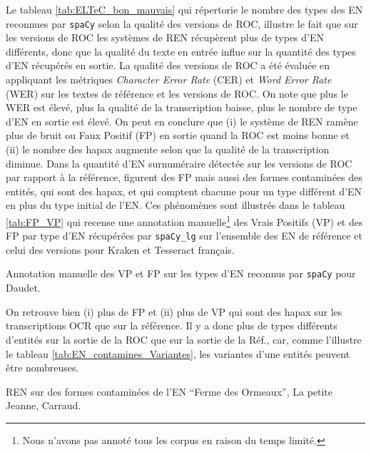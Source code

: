 Le tableau \ref{tab:ELTeC_bon_mauvais} qui répertorie le nombre des types des EN reconnues par \texttt{spaCy} selon la qualité des versions de ROC, illustre le fait que sur les versions de ROC les systèmes de REN récupèrent plus de types d'EN différents, donc que la qualité du texte en entrée influe sur la quantité des types d'EN récupérés en sortie. La qualité des versions de ROC a été évaluée en appliquant les métriques \textit{Character Error Rate} (CER) et \textit{Word Error Rate} (WER) sur les textes de référence et les versions de ROC. On note que plus le WER est élevé, plus la qualité de la transcription baisse, plus le nombre de type d'EN en sortie est élevé. On peut en conclure que (i) le système de REN ramène plus de bruit ou Faux Positif (FP) en sortie quand la ROC est moins bonne et (ii) le nombre des hapax augmente selon que la qualité de la transcription diminue. 
Dans la quantité d'EN surnuméraire détectée sur les versions de ROC par rapport à la référence, figurent des FP mais aussi des formes contaminées des entités, qui sont des hapax, et qui comptent chacune pour un type différent d'EN en plus du type initial de l'EN. Ces phénomènes sont illustrés dans le tableau \ref{tab:FP_VP} qui recense une annotation manuelle\footnote{Nous n'avons pas annoté tous les corpus en raison du temps limité.} des Vrais Positifs (VP) et des FP par type d'EN récupérées par \texttt{spaCy\_lg} sur l'ensemble des EN de référence et celui des versions pour Kraken et Tesseract français. 
\begin{table}[h!]
\small
    \centering
    
    \caption{Annotation manuelle des VP et FP sur les types d'EN reconnus par \texttt{spaCy} pour Daudet.}
    \label{tab:FP_VP}
\end{table}

On retrouve bien (i) plus de FP et (ii) plus de VP qui sont des hapax sur les transcriptions OCR que sur la référence. Il y a donc plus de types différents d'entités sur la sortie de la ROC que sur la sortie de la Réf., car, comme l'illustre le tableau \ref{tab:EN_contamines_Variantes}, les variantes d'une entités peuvent être nombreuses. 



\begin{table}[h!]
\small
    \centering
    
    \caption{REN sur des formes contaminées de l'EN ``Ferme des Ormeaux'', {\normalfont La petite Jeanne}, Carraud.}
    \label{tab:EN_contamines_Variantes}
\end{table}

